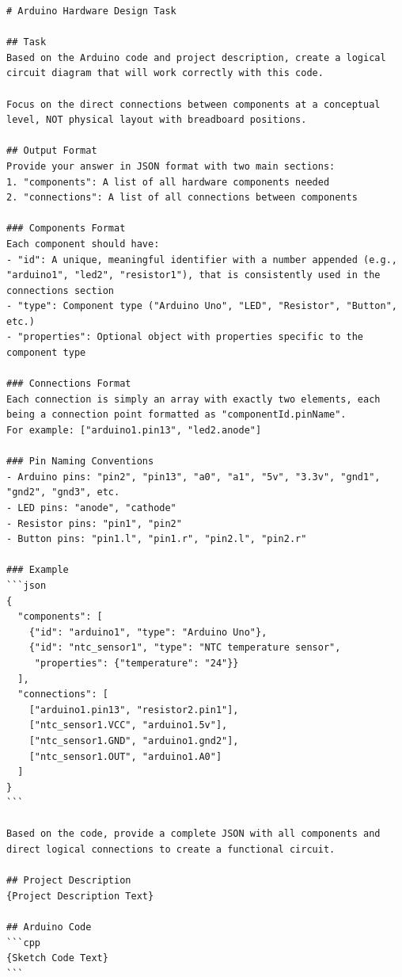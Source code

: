 \documentclass{article} %
\newlength{\promptboxmargin}
\begin{document}
\begin{adjustwidth}{\promptboxmargin}{\promptboxmargin}
\begin{lstlisting}[style=promptstyle, caption={Circuit Generation Task (Logical)}, basicstyle=\ttfamily\footnotesize]
# Arduino Hardware Design Task

## Task
Based on the Arduino code and project description, create a logical circuit diagram that will work correctly with this code.

Focus on the direct connections between components at a conceptual level, NOT physical layout with breadboard positions.

## Output Format
Provide your answer in JSON format with two main sections:
1. "components": A list of all hardware components needed
2. "connections": A list of all connections between components

### Components Format
Each component should have:
- "id": A unique, meaningful identifier with a number appended (e.g., "arduino1", "led2", "resistor1"), that is consistently used in the connections section
- "type": Component type ("Arduino Uno", "LED", "Resistor", "Button", etc.)
- "properties": Optional object with properties specific to the component type

### Connections Format
Each connection is simply an array with exactly two elements, each being a connection point formatted as "componentId.pinName".
For example: ["arduino1.pin13", "led2.anode"]

### Pin Naming Conventions
- Arduino pins: "pin2", "pin13", "a0", "a1", "5v", "3.3v", "gnd1", "gnd2", "gnd3", etc.
- LED pins: "anode", "cathode"
- Resistor pins: "pin1", "pin2"
- Button pins: "pin1.l", "pin1.r", "pin2.l", "pin2.r"

### Example
```json
{
  "components": [
    {"id": "arduino1", "type": "Arduino Uno"},
    {"id": "ntc_sensor1", "type": "NTC temperature sensor",
     "properties": {"temperature": "24"}}
  ],
  "connections": [
    ["arduino1.pin13", "resistor2.pin1"],
    ["ntc_sensor1.VCC", "arduino1.5v"],
    ["ntc_sensor1.GND", "arduino1.gnd2"],
    ["ntc_sensor1.OUT", "arduino1.A0"]
  ]
}
```

Based on the code, provide a complete JSON with all components and direct logical connections to create a functional circuit.

## Project Description
{Project Description Text}

## Arduino Code
```cpp
{Sketch Code Text}
```
\end{lstlisting}
\end{adjustwidth}
\end{document}
